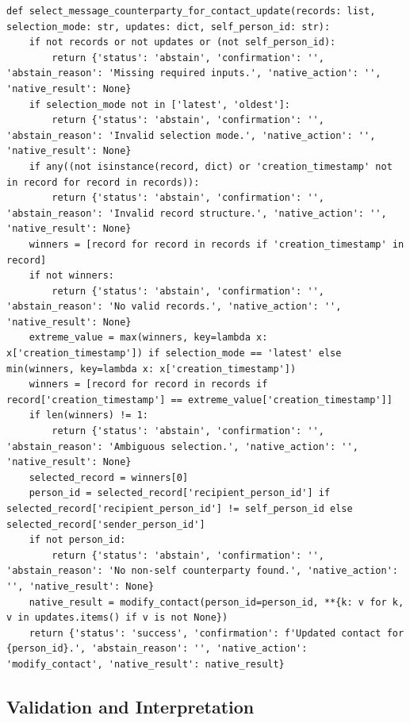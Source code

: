 \begin{lstlisting}[style=sagepython,caption={Accepted message-counterparty contact-update native-action tool.},label={lst:sage-message-counterparty-update}]
def select_message_counterparty_for_contact_update(records: list, selection_mode: str, updates: dict, self_person_id: str):
    if not records or not updates or (not self_person_id):
        return {'status': 'abstain', 'confirmation': '', 'abstain_reason': 'Missing required inputs.', 'native_action': '', 'native_result': None}
    if selection_mode not in ['latest', 'oldest']:
        return {'status': 'abstain', 'confirmation': '', 'abstain_reason': 'Invalid selection mode.', 'native_action': '', 'native_result': None}
    if any((not isinstance(record, dict) or 'creation_timestamp' not in record for record in records)):
        return {'status': 'abstain', 'confirmation': '', 'abstain_reason': 'Invalid record structure.', 'native_action': '', 'native_result': None}
    winners = [record for record in records if 'creation_timestamp' in record]
    if not winners:
        return {'status': 'abstain', 'confirmation': '', 'abstain_reason': 'No valid records.', 'native_action': '', 'native_result': None}
    extreme_value = max(winners, key=lambda x: x['creation_timestamp']) if selection_mode == 'latest' else min(winners, key=lambda x: x['creation_timestamp'])
    winners = [record for record in records if record['creation_timestamp'] == extreme_value['creation_timestamp']]
    if len(winners) != 1:
        return {'status': 'abstain', 'confirmation': '', 'abstain_reason': 'Ambiguous selection.', 'native_action': '', 'native_result': None}
    selected_record = winners[0]
    person_id = selected_record['recipient_person_id'] if selected_record['recipient_person_id'] != self_person_id else selected_record['sender_person_id']
    if not person_id:
        return {'status': 'abstain', 'confirmation': '', 'abstain_reason': 'No non-self counterparty found.', 'native_action': '', 'native_result': None}
    native_result = modify_contact(person_id=person_id, **{k: v for k, v in updates.items() if v is not None})
    return {'status': 'success', 'confirmation': f'Updated contact for {person_id}.', 'abstain_reason': '', 'native_action': 'modify_contact', 'native_result': native_result}
\end{lstlisting}

\subsection{Validation and
Interpretation}\label{validation-and-interpretation-3}

